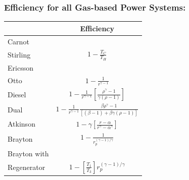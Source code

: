 \documentclass[10pt,compress]{beamer}
\newcommand{\frc}{\displaystyle\frac}
\begin{document}
\begin{frame}
 \frametitle{Efficiency for all Gas-based Power Systems:}

\begin{tabular}{| l  c |}
\hline
         & Efficiency   \\
\hline
Carnot   &                         \\
Stirling & $1 - \frc{T_{C}}{T_{H}}$ \\
Ericsson &                         \\
\hline
Otto     & $1 - \frc{1}{r^{\gamma-1}}$ \\
\hline
Diesel   & $1 - \frc{1}{r^{\gamma-1}} \left[\frc{\rho^{\gamma}-1}{\gamma\left(\rho-1\right)}\right]$ \\
\hline
Dual     & $1 - \frc{1}{r^{\gamma-1}} \frc{\beta\rho^{\gamma}-1}{\left[\left(\beta-1\right)+\beta\gamma\left(\rho-1\right)\right]}$ \\
\hline
Atkinson & $1- \gamma\left[\frc{r-\alpha}{r^{\gamma}-\alpha^{\gamma}}\right]$ \\
\hline
Brayton  & $1 - \frc{1}{r_{p}^{\left(\gamma-1\right)/\gamma}}$\\
\hline
Brayton with &  \\
Regenerator & $1 - \left[\frc{T_{1}}{T_{3}}\right] r_{p}^{\left(\gamma-1\right)/\gamma}$ \\

\hline

\end{tabular}

\end{frame}
\end{document}
